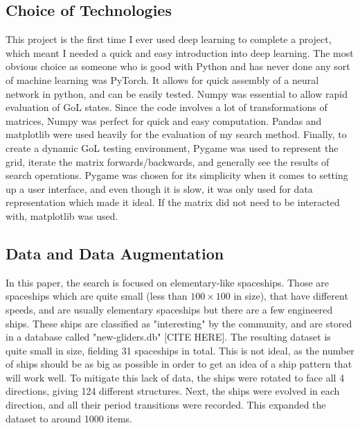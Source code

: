 \documentclass{l4proj}
\begin{document}
\subsection{Choice of Technologies}

This project is the first time I ever used deep learning to complete a project, which meant I needed a quick and easy introduction into deep learning. The most obvious choice as someone who is good with Python and has never done any sort of machine learning was PyTorch. It allows for quick assembly of a neural network in python, and can be easily tested. Numpy was essential to allow rapid evaluation of GoL states. Since the code involves a lot of transformations of matrices, Numpy was perfect for quick and easy computation. Pandas and matplotlib were used heavily for the evaluation of my search method. Finally, to create a dynamic GoL testing environment, Pygame was used to represent the grid, iterate the matrix forwards/backwards, and generally see the results of search operations. Pygame was chosen for its simplicity when it comes to setting up a user interface, and even though it is slow, it was only used for data representation which made it ideal. If the matrix did not need to be interacted with, matplotlib was used. %

\subsection{Data and Data Augmentation}

In this paper, the search is focused on elementary-like spaceships. Those are spaceships which are quite small (less than $100 \times 100$ in size), that have different speeds, and are usually elementary spaceships but there are a few engineered ships. These ships are classified as "interesting" by the community, and are stored in a database called "new-gliders.db" [CITE HERE]. The resulting dataset is quite small in size, fielding 31 spaceships in total. This is not ideal, as the number of ships should be as big as possible in order to get an idea of a ship pattern that will work well. To mitigate this lack of data, the ships were rotated to face all 4 directions, giving 124 different structures. Next, the ships were evolved in each direction, and all their period transitions were recorded. This expanded the dataset to around 1000 items.
\end{document}

